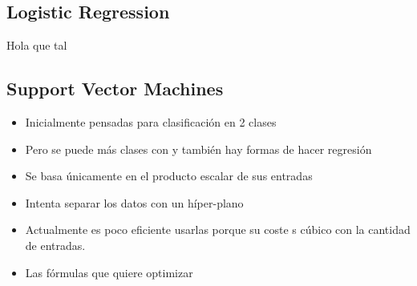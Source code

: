   \subsection{Logistic Regression}
  \begin{delivery}
    Hola que tal
  \end{delivery}
  \subsection{Support Vector Machines}
  \begin{note}
    \begin{itemize}
      \item Inicialmente pensadas para clasificación en 2 clases
      \item Pero se puede más clases con  y también hay
      formas de hacer regresión
      \item Se basa únicamente en el producto escalar de sus entradas
      \item Intenta separar los datos con un híper-plano
      \item Actualmente es poco eficiente usarlas porque su coste s cúbico
      con la cantidad de entradas.
      \item Las fórmulas que quiere optimizar
    \end{itemize}
  \end{note}

